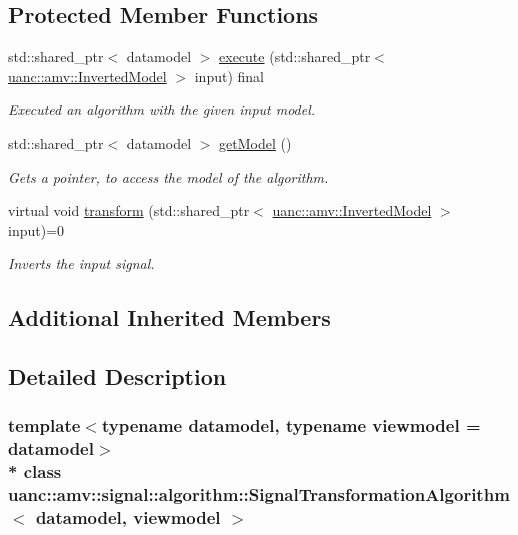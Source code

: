 \subsection*{Protected Member Functions}
\begin{DoxyCompactItemize}
\item 
std\+::shared\+\_\+ptr$<$ datamodel $>$ \hyperlink{classuanc_1_1amv_1_1signal_1_1algorithm_1_1_signal_transformation_algorithm_a7118b46dcfdadf8648cf927c4bdd70d0}{execute} (std\+::shared\+\_\+ptr$<$ \hyperlink{classuanc_1_1amv_1_1_inverted_model}{uanc\+::amv\+::\+Inverted\+Model} $>$ input) final
\begin{DoxyCompactList}\small\item\em Executed an algorithm with the given input model. \end{DoxyCompactList}\item 
std\+::shared\+\_\+ptr$<$ datamodel $>$ \hyperlink{classuanc_1_1amv_1_1signal_1_1algorithm_1_1_signal_transformation_algorithm_acb59a47bcaf75198a7f5e3a2f1392942}{get\+Model} ()
\begin{DoxyCompactList}\small\item\em Gets a pointer, to access the model of the algorithm. \end{DoxyCompactList}\item 
virtual void \hyperlink{classuanc_1_1amv_1_1signal_1_1algorithm_1_1_signal_transformation_algorithm_a40dee2d59e84244373cacc9c472514d6}{transform} (std\+::shared\+\_\+ptr$<$ \hyperlink{classuanc_1_1amv_1_1_inverted_model}{uanc\+::amv\+::\+Inverted\+Model} $>$ input)=0
\begin{DoxyCompactList}\small\item\em Inverts the input signal. \end{DoxyCompactList}\end{DoxyCompactItemize}
\subsection*{Additional Inherited Members}


\subsection{Detailed Description}
\subsubsection*{template$<$typename datamodel, typename viewmodel = datamodel$>$\\*
class uanc\+::amv\+::signal\+::algorithm\+::\+Signal\+Transformation\+Algorithm$<$ datamodel, viewmodel $>$}

